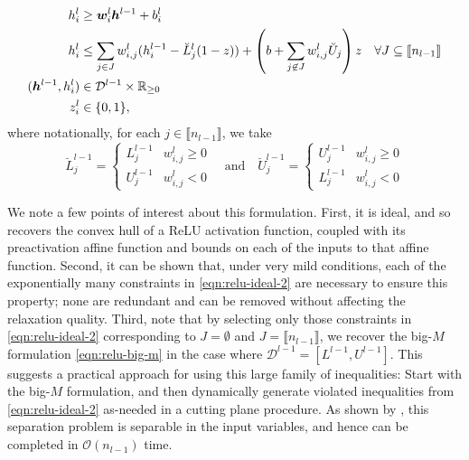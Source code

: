 \begin{subequations} \label{eqn:relu-ideal}
\begin{align}
    h^l_i &\geq {\bm{w}}_i^l {\bm{h}}^{l-1} + b^l_i \label{eqn:relu-ideal-1} \\
    h^l_i &\leq \sum_{j \in J} w^{l}_{i,j}(h^{l-1}_i - \breve{L}^{l}_j(1-z)) + \left(b + \sum_{j \not\in J} w^{l}_{i,j}\breve{U}_j \right)z \quad \forall J \subseteq \llbracket n_{l-1} \rrbracket \label{eqn:relu-ideal-2} \\
    ({\bm{h}}^{l-1},h^l_i) &\in \mathcal{D}^{l-1} \times \mathbb{R}_{\geq 0} \label{eqn:relu-ideal-3} \\
    z^l_i &\in \{0,1\},
\end{align}
\end{subequations}
where notationally, for each $j \in \llbracket n_{l-1} \rrbracket$, we take 
\begin{equation*}
\breve{L}^{l-1}_j = \begin{cases} L^{l-1}_j & w^{l}_{i,j} \geq 0 \\ U^{l-1}_j & w^{l}_{i,j} < 0 \end{cases} \quad \mathrm{and} \quad \breve{U}^{l-1}_j = \begin{cases} U^{l-1}_j & w^{l}_{i,j} \geq 0 \\ L^{l-1}_j & w^{l}_{i,j} < 0 \end{cases} 
\end{equation*}

We note a few points of interest about this formulation. First, it is ideal, and so recovers the convex hull of a ReLU activation function, coupled with its preactivation affine function and bounds on each of the inputs to that affine function. Second, it can be shown that, under very mild conditions, each of the exponentially many constraints in \eqref{eqn:relu-ideal-2} are necessary to ensure this property; none are redundant and can be removed without affecting the relaxation quality. Third, note that by selecting only those constraints in \eqref{eqn:relu-ideal-2} corresponding to $J = \emptyset$ and $J = \llbracket n_{l-1} \rrbracket$, we recover the big-$M$ formulation \eqref{eqn:relu-big-m} in the case where $\mathcal{D}^{l-1} = [L^{l-1},U^{l-1}]$. This suggests a practical approach for using this large family of inequalities: Start with the big-$M$ formulation, and then dynamically generate violated inequalities from \eqref{eqn:relu-ideal-2} as-needed in a cutting plane procedure. As shown by \cite{anderson2020strong}, this separation problem is separable in the input variables, and hence can be completed in $\mathcal{O}(n_{l-1})$ time. 

